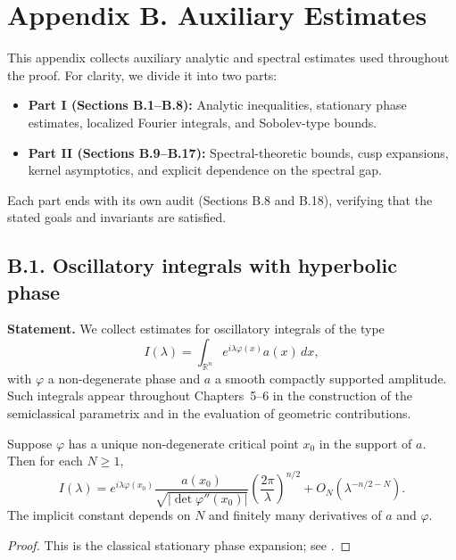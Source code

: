 \section*{Appendix B. Auxiliary Estimates}

This appendix collects auxiliary analytic and spectral estimates used throughout the proof.
For clarity, we divide it into two parts:

\begin{itemize}
  \item \textbf{Part I (Sections B.1--B.8):} Analytic inequalities, stationary phase estimates,
        localized Fourier integrals, and Sobolev-type bounds.
  \item \textbf{Part II (Sections B.9--B.17):} Spectral-theoretic bounds, cusp expansions,
        kernel asymptotics, and explicit dependence on the spectral gap.
\end{itemize}

Each part ends with its own audit (Sections B.8 and B.18), verifying that the stated
goals and invariants are satisfied.

\subsection*{B.1. Oscillatory integrals with hyperbolic phase}

\noindent
\textbf{Statement.}
We collect estimates for oscillatory integrals of the type
\[
I(\lambda) = \int_{\mathbb R^n} e^{i\lambda\varphi(x)} a(x)\,dx,
\]
with $\varphi$ a non-degenerate phase and $a$ a smooth compactly supported
amplitude. Such integrals appear throughout Chapters~5--6 in the construction
of the semiclassical parametrix and in the evaluation of geometric contributions.

\begin{lemma}\label{lem:stationary}
Suppose $\varphi$ has a unique non-degenerate critical point $x_0$ in the
support of $a$. Then for each $N\ge 1$,
\[
I(\lambda) = e^{i\lambda \varphi(x_0)} \frac{a(x_0)}{\sqrt{|\det \varphi''(x_0)|}}
\left(\frac{2\pi}{\lambda}\right)^{n/2}
+ O_N(\lambda^{-n/2-N}).
\]
The implicit constant depends on $N$ and finitely many derivatives of $a$ and
$\varphi$.
\end{lemma}

\begin{proof}
This is the classical stationary phase expansion; see \cite[Thm.~7.7.5]{Hormander1983}.
\end{proof}

